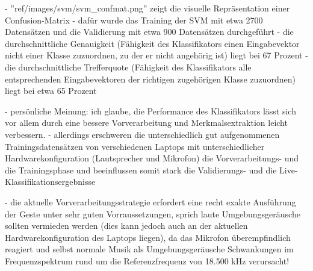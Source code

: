 - ''ref/images/svm/svm\_confmat.png'' zeigt die visuelle Repräsentation einer Confusion-Matrix
- dafür wurde das Training der SVM mit etwa 2700 Datensätzen und die Validierung mit etwa 900 Datensätzen durchgeführt
- die durchschnittliche Genauigkeit (Fähigkeit des Klassifikators einen Eingabevektor nicht einer Klasse zuzuordnen, zu der er nicht angehörig ist) liegt bei 67 Prozent
- die durchschnittliche Trefferquote (Fähigkeit des Klassifikators alle entsprechenden Eingabevektoren der richtigen zugehörigen Klasse zuzuordnen) liegt bei etwa 65 Prozent

- persönliche Meinung: ich glaube, die Performance des Klassifikators lässt sich vor allem durch eine bessere Vorverarbeitung und Merkmalsextraktion leicht verbessern.
- allerdings erschweren die unterschiedlich gut aufgenommenen Trainingsdatensätzen von verschiedenen Laptops mit unterschiedlicher Hardwarekonfiguration (Lautsprecher und Mikrofon) die Vorverarbeitungs- und die Trainingsphase und beeinflussen somit stark die Validierungs- und die Live-Klassifikationsergebnisse

- die aktuelle Vorverarbeitungsstrategie erfordert eine recht exakte Ausführung der Geste unter sehr guten Vorraussetzungen, sprich laute Umgebungsgeräusche sollten vermieden werden (dies kann jedoch auch an der aktuellen Hardwarekonfiguration des Laptops liegen), da das Mikrofon überempfindlich reagiert und selbst normale Musik als Umgebungsgeräusche Schwankungen im Frequenzspektrum rund um die Referenzfrequenz von 18.500 kHz verursacht!
